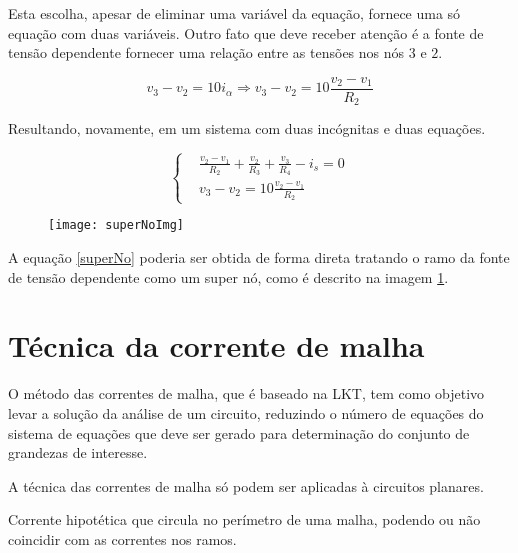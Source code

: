 \documentclass[12pt,fleqn]{book} %
\begin{document}
\begin{example}[Aplicação]
    Esta escolha, apesar de eliminar uma variável da equação, fornece uma só equação com duas variáveis. Outro fato que deve receber atenção é a fonte de tensão dependente fornecer uma relação entre as tensões nos nós $3$ e $2$.
    
    \begin{equation}
    v_3-v_2 = 10i_\alpha \Rightarrow v_3-v_2 = 10\frac{v_2-v_1}{R_2}
    \end{equation}
    
    Resultando, novamente, em um sistema com duas incógnitas e duas equações.
    
    \begin{equation}\label{sistemaNo}
    \left\{\begin{aligned} & 
          \frac{v_2-v_1}{R_2} + \frac{v_2}{R_3}+\frac{v_3}{R_4}-i_s = 0\\&
         v_3-v_2 = 10\frac{v_2-v_1}{R_2}
    \end{aligned}\right.
    \end{equation}
    
\begin{figure}[!htbp] \centering\texttt{[image: superNoImg]}
            \caption{}\label{superNoImg} 
        \end{figure}    
    
    A equação \ref{superNo} poderia ser obtida de forma direta tratando o ramo da fonte de tensão dependente como um super nó, como é descrito na imagem \ref{superNoImg}.
    \end{example}

\section{Técnica da corrente de malha}

O método das correntes de malha, que é baseado na LKT, tem como objetivo levar a solução da análise de um circuito, reduzindo o número de equações do sistema de equações que deve ser gerado para determinação do conjunto de grandezas de interesse.

\begin{remark}
A técnica das correntes de malha só podem ser aplicadas à circuitos planares.
\end{remark}

\begin{definition}
Corrente hipotética que circula no perímetro de uma malha, podendo ou não coincidir com as correntes nos ramos.
\end{definition}
\end{document}
